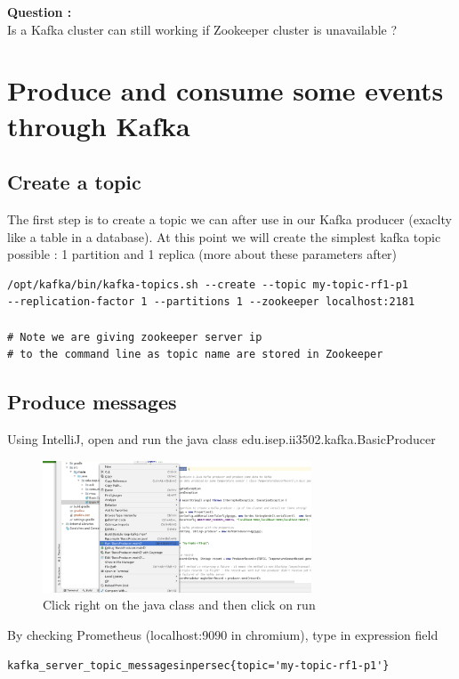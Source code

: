 \documentclass{article}
\newcounter{question}
\newenvironment{question}
    { \begin{mdframed}[backgroundcolor=gray!20] \textbf{Question \arabic{question} : } \stepcounter{question} \\}
    {  \end{mdframed}}
\newenvironment{code}
    { \begin{mdframed} }    {  \end{mdframed}}
\begin{document}
\begin{question}
  Is a Kafka cluster can still working if Zookeeper cluster is unavailable ?  
\end{question}


\section{Produce and consume some events through Kafka}
\subsection{Create a topic}
The first step is to create a topic we can after use in our Kafka producer (exaclty like a table in a database). At this point we will create the simplest kafka topic possible : 1 partition and 1 replica (more about these parameters after)

\begin{code}
    \begin{verbatim}
/opt/kafka/bin/kafka-topics.sh --create --topic my-topic-rf1-p1 
--replication-factor 1 --partitions 1 --zookeeper localhost:2181

# Note we are giving zookeeper server ip
# to the command line as topic name are stored in Zookeeper
    \end{verbatim}
\end{code}
\subsection{Produce messages}
Using IntelliJ, open and run the java class edu.isep.ii3502.kafka.BasicProducer

\begin{figure}[H]
\includegraphics[width=8cm]{runJava.png}
\caption{Click right on the java class and then click on run}
\centering
\end{figure}





By checking Prometheus (localhost:9090 in chromium), type in expression field
  \begin{verbatim}
kafka_server_topic_messagesinpersec{topic='my-topic-rf1-p1'}
    \end{verbatim}
\end{document}
